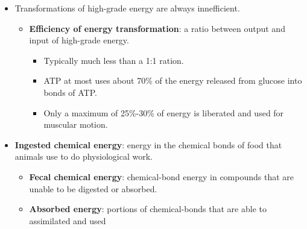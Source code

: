 \documentclass[12pt,a4paper]{article}
\begin{document}
\begin{itemize}
    \item Transformations of high-grade energy are {\color{o-Sun}always innefficient}.
        \begin{itemize}
            \item \textbf{Efficiency of energy transformation}: a ratio between output and input of high-grade energy.
                \begin{itemize}
                    \item Typically much less than a 1:1 ration.
                    \item ATP at most uses about 70\% of the energy released from glucose into bonds of ATP.
                    \item Only a maximum of 25\%-30\% of energy is liberated and used for muscular motion.
                \end{itemize}
        \end{itemize}
    \item \textbf{Ingested chemical energy}: energy in the chemical bonds of food that animals use to do physiological work.
        \begin{itemize}
            \item \textbf{Fecal chemical energy}: chemical-bond energy in compounds that are unable to be digested or absorbed.
            \item \textbf{Absorbed energy}: portions of chemical-bonds that are able to assimilated and used 
        \end{itemize}

\end{itemize}
\end{document}
